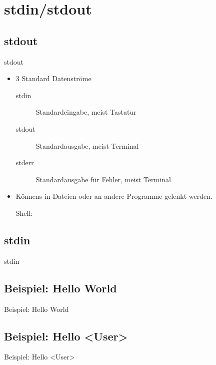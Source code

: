 \documentclass{beamer}
\begin{document}
\section{stdin/stdout}
\subsection{stdout}
\begin{frame}[<+->][fragile]{stdout}
\begin{itemize}
\item 3 Standard Datenströme
\begin{small}
\begin{description}
\item[stdin] Standardeingabe, meist Tastatur
\item[stdout] Standardausgabe, meist Terminal
\item[stderr] Standardausgabe für Fehler, meist Terminal
\end{description}
\end{small}
\item Könnens in Dateien oder an andere Programme gelenkt werden.
\begin{block}{Shell:}
\end{block}
\end{itemize}
\end{frame}

\subsection{stdin}
\begin{frame}{stdin}
\end{frame}

\subsection{Beispiel: Hello World}
\begin{frame}{Beispiel: Hello World}
\end{frame}

\subsection{Beispiel: Hello <User>}
\begin{frame}{Beispiel: Hello <User>}
\end{frame}
\end{document}
